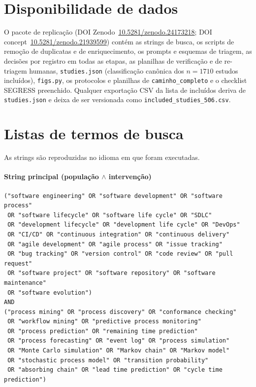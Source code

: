 \documentclass[preprint,12pt,authoryear=false]{elsarticle}
\begin{document}
\section*{Disponibilidade de dados}
O pacote de replicação (DOI Zenodo~\href{https://doi.org/10.5281/zenodo.24173218}{10.5281/zenodo.24173218}; DOI concept~\href{https://doi.org/10.5281/zenodo.21939599}{10.5281/zenodo.21939599}) contém as strings de busca, os scripts de remoção de duplicatas e de enriquecimento, os prompts e esquemas de triagem, as decisões por registro em todas as etapas, as planilhas de verificação e de re-triagem humanas, \texttt{studies.json} (classificação canônica dos $n = 1710$ estudos incluídos), \texttt{figs.py}, os protocolos e planilhas de \texttt{caminho\_completo} e o checklist SEGRESS preenchido. Qualquer exportação CSV da lista de incluídos deriva de \texttt{studies.json} e deixa de ser versionada como \texttt{included\_studies\_506.csv}.

\appendix

\section{Listas de termos de busca}\label{app:strings}

As strings são reproduzidas no idioma em que foram executadas.

\paragraph{String principal (população $\wedge$ intervenção)}
\begin{footnotesize}\begin{verbatim}
("software engineering" OR "software development" OR "software process"
 OR "software lifecycle" OR "software life cycle" OR "SDLC"
 OR "development lifecycle" OR "development life cycle" OR "DevOps"
 OR "CI/CD" OR "continuous integration" OR "continuous delivery"
 OR "agile development" OR "agile process" OR "issue tracking"
 OR "bug tracking" OR "version control" OR "code review" OR "pull request"
 OR "software project" OR "software repository" OR "software maintenance"
 OR "software evolution")
AND
("process mining" OR "process discovery" OR "conformance checking"
 OR "workflow mining" OR "predictive process monitoring"
 OR "process prediction" OR "remaining time prediction"
 OR "process forecasting" OR "event log" OR "process simulation"
 OR "Monte Carlo simulation" OR "Markov chain" OR "Markov model"
 OR "stochastic process model" OR "transition probability"
 OR "absorbing chain" OR "lead time prediction" OR "cycle time prediction")
\end{verbatim}\end{footnotesize}
\end{document}
